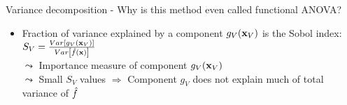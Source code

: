 \documentclass[11pt,compress,t,notes=noshow, aspectratio=169, xcolor=table]{beamer}
\newcommand{\open}{}
\newcommand{\close}{}
\begin{document}
\begin{frame}{Variance decomposition - Why is this method even called functional ANOVA?}
\begin{itemize}[<+->]
\item Fraction of variance explained by a component $g_{\open V \close}(\xv_V)$ is the Sobol index:
$
S_V = \frac{Var\left[g_{\open V \close}(\xv_V)\right]}{Var\left[\hat{f}(\xv)\right]}
$\\
$\leadsto$ Importance measure of component $g_{\open V \close}(\xv_V)$\\
$\leadsto$ Small $S_V$ values $\Rightarrow$ Component $g_{\open V \close}$ does not explain much of total variance of $\hat{f}$
\end{itemize}

\end{frame}











\endlecture
\end{document}
